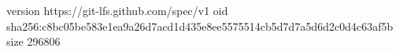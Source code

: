 version https://git-lfs.github.com/spec/v1
oid sha256:c8bc05be583e1ea9a26d7acd1d435e8ee5575514cb5d7d7a5d6d2c0d4c63af5b
size 296806
